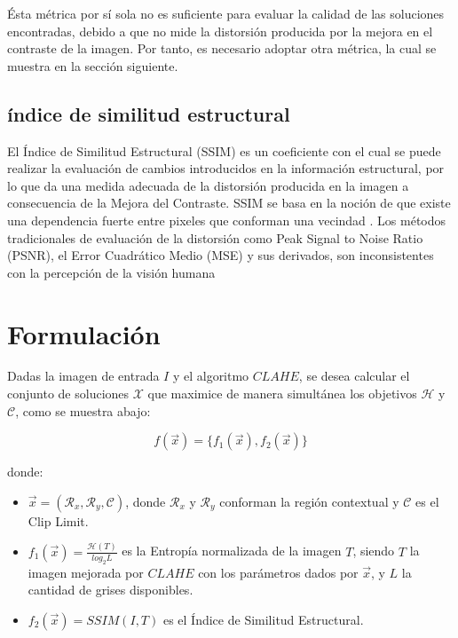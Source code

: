 \documentclass[spanish]{article}
\begin{document}
Ésta métrica por sí sola no es suficiente para evaluar la calidad de las soluciones encontradas, debido a que no mide la distorsión producida por la mejora en el contraste de la imagen. Por tanto, es necesario adoptar otra métrica, la cual se muestra en la sección siguiente. 

\subsection{índice de similitud estructural}
\label{ssec:ssim}

El Índice de Similitud Estructural (SSIM) es un coeficiente con el cual se puede realizar la evaluación de cambios introducidos en la información estructural, por lo que da una medida adecuada de la distorsión producida en la imagen a consecuencia de la Mejora del Contraste. SSIM se basa en la noción de que existe una dependencia fuerte entre pixeles que conforman una vecindad \cite{kwok2013locally}. Los métodos tradicionales de evaluación de la distorsión como Peak Signal to Noise Ratio (PSNR), el Error Cuadrático Medio (MSE) y sus derivados, son inconsistentes con la percepción de la visión humana \cite{}

\section{Formulación}
\label{sec:formulacion}

Dadas la imagen de entrada $I$ y el algoritmo $CLAHE$, se desea calcular el conjunto de soluciones $\mathscr{X}$ que maximice de manera simultánea los objetivos $\mathscr{H}$ y $\mathcal{C}$, como se muestra abajo:

\begin{equation}\label{eq:fitness}
    f(\overrightarrow{x}) = \{ f_1(\overrightarrow{x}), f_2(\overrightarrow{x}) \}
\end{equation}

donde:
\begin{itemize}
\item $\overrightarrow{x}=(\mathcal{R}_x, \mathcal{R}_y, \mathcal{C})$, donde $\mathcal{R}_x$ y $\mathcal{R}_y$ conforman la región contextual y $\mathscr{C}$ es el Clip Limit.
\item $f_{1}(\overrightarrow{x})=\frac{\mathscr{H}(T)}{log_{2}L}$ es la Entropía normalizada de la imagen $T$, siendo $T$ la imagen mejorada por $CLAHE$ con los parámetros dados por $\overrightarrow{x}$, y $L$ la cantidad de grises disponibles.
\item $f_{2}(\overrightarrow{x})=SSIM(I,T)$ es el Índice de Similitud Estructural.
\end{itemize}
\end{document}
